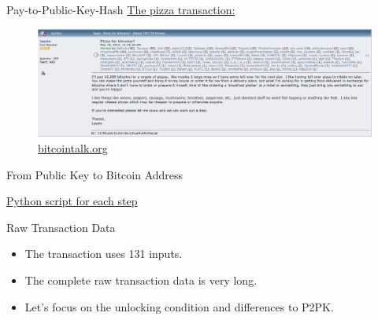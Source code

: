 \documentclass[handout]{beamer}
\begin{document}
\begin{frame}{Pay-to-Public-Key-Hash}
	\href{https://blockstream.info/tx/a1075db55d416d3ca199f55b6084e2115b9345e16c5cf302fc80e9d5fbf5d48d}{\link The pizza transaction:}\\
	\begin{figure}
	\includegraphics[scale=0.3]{../assets/images/pizza_blogpost}	
	\caption*{\href{https://bitcointalk.org/index.php?topic=137.0}{\link bitcointalk.org}}
	\end{figure}
\end{frame}

\begin{frame}{From Public Key to Bitcoin Address}
\vspace{-0.5em}
\begin{figure}
	
\end{figure}
\vspace{-1em}
\scriptsize
\href{https://github.com/cifunibas/Bitcoin-Blockchain-Cryptoassets/blob/main/assets/scripts/bitcoin_address.py}{\link Python script for each step} \\
\end{frame}

\begin{frame}{Raw Transaction Data}
	\begin{itemize}
		\item The transaction uses 131 inputs.
		\item The complete raw transaction data is very long.
		\item Let's focus on the unlocking condition and differences to P2PK.
	\end{itemize}
\end{frame}
\end{document}
